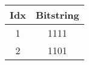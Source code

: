 \documentclass{standalone}
\begin{document}
	\begin{tabular}{cc}
		\toprule
		Idx & Bitstring \\
		\midrule
		\rowcolor{CBOne}
		1 &  1111 \\
		\rowcolor{CBTwo}
		2 & 1101 \\
		\bottomrule
	\end{tabular}
\end{document}
